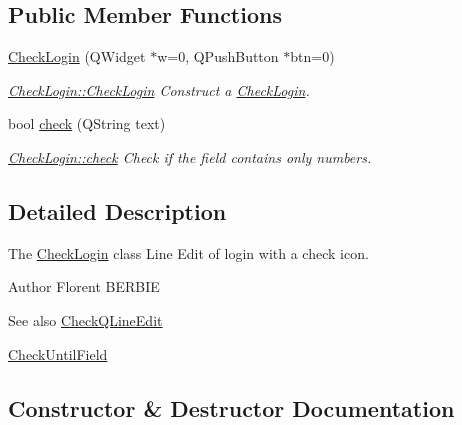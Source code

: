 \subsection*{Public Member Functions}
\begin{DoxyCompactItemize}
\item 
\hyperlink{classGui_1_1Widgets_1_1CheckFields_1_1CheckLogin_ae6c94e817b4b079329d6c4c129fd2a4c}{Check\+Login} (Q\+Widget $\ast$w=0, Q\+Push\+Button $\ast$btn=0)
\begin{DoxyCompactList}\small\item\em \hyperlink{classGui_1_1Widgets_1_1CheckFields_1_1CheckLogin_ae6c94e817b4b079329d6c4c129fd2a4c}{Check\+Login\+::\+Check\+Login} Construct a \hyperlink{classGui_1_1Widgets_1_1CheckFields_1_1CheckLogin}{Check\+Login}. \end{DoxyCompactList}\item 
bool \hyperlink{classGui_1_1Widgets_1_1CheckFields_1_1CheckLogin_a66e6d426253b5219a55b7ccada37d9b9}{check} (Q\+String text)
\begin{DoxyCompactList}\small\item\em \hyperlink{classGui_1_1Widgets_1_1CheckFields_1_1CheckLogin_a66e6d426253b5219a55b7ccada37d9b9}{Check\+Login\+::check} Check if the field contains only numbers. \end{DoxyCompactList}\end{DoxyCompactItemize}


\subsection{Detailed Description}
The \hyperlink{classGui_1_1Widgets_1_1CheckFields_1_1CheckLogin}{Check\+Login} class Line Edit of login with a check icon. 

\begin{DoxyAuthor}{Author}
Florent B\+E\+R\+B\+I\+E 
\end{DoxyAuthor}
\begin{DoxySeeAlso}{See also}
\hyperlink{classGui_1_1Widgets_1_1CheckFields_1_1CheckQLineEdit}{Check\+Q\+Line\+Edit} 

\hyperlink{classGui_1_1Widgets_1_1CheckFields_1_1CheckUntilField}{Check\+Until\+Field} 
\end{DoxySeeAlso}


\subsection{Constructor \& Destructor Documentation}
\hypertarget{classGui_1_1Widgets_1_1CheckFields_1_1CheckLogin_ae6c94e817b4b079329d6c4c129fd2a4c}{}

